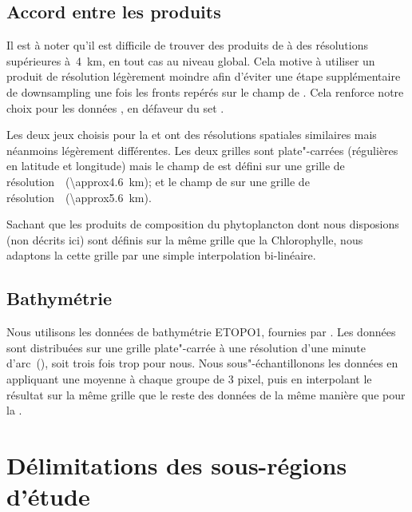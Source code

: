 \subsection{Accord entre les produits}

Il est à noter qu'il est difficile de trouver des produits de  à des résolutions supérieures à~\qty{4}{\km}, en tout cas au niveau global.
Cela motive à utiliser un produit  de résolution légèrement moindre afin d'éviter une étape supplémentaire de downsampling une fois les fronts repérés sur le champ de .
Cela renforce notre choix pour les données , en défaveur du set .

Les deux jeux choisis pour la  et  ont des résolutions spatiales similaires mais néanmoins légèrement différentes.
Les deux grilles sont plate"-carrées (régulières en latitude et longitude) mais le champ de  est défini sur une grille  de résolution~~(\qty{\approx4.6}{\km}); et le champ de  sur une grille  de résolution~~(\qty{\approx5.6}{\km}).

Sachant que les produits de composition du phytoplancton dont nous disposions (non décrits ici) sont définis sur la même grille que la Chlorophylle, nous adaptons la  cette grille par une simple interpolation bi-linéaire.

\subsection{Bathymétrie}
\label{sec:donnees-bathymetrie}

Nous utilisons les données de bathymétrie ETOPO1, fournies par .
Les données sont distribuées sur une grille plate"-carrée à une résolution d'une minute d'arc~(), soit trois fois trop pour nous.
Nous sous"-échantillonons les données en appliquant une moyenne à chaque groupe de 3 pixel, puis en interpolant le résultat sur la même grille que le reste des données de la même manière que pour la .

\section{Délimitations des sous-régions d'étude}
\label{sec:delimitations-regions}

